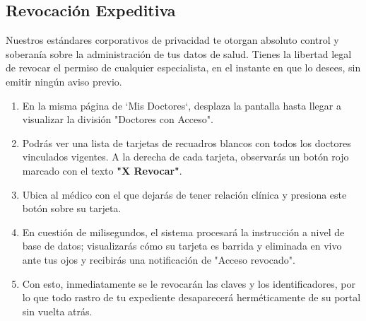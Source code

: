 \subsection{Revocación Expeditiva}
Nuestros estándares corporativos de privacidad te otorgan absoluto control y soberanía sobre la administración de tus datos de salud. Tienes la libertad legal de revocar el permiso de cualquier especialista, en el instante en que lo desees, sin emitir ningún aviso previo.
\begin{enumerate}
    \item En la misma página de `Mis Doctores`, desplaza la pantalla hasta llegar a visualizar la división "Doctores con Acceso".
    \item Podrás ver una lista de tarjetas de recuadros blancos con todos los doctores vinculados vigentes. A la derecha de cada tarjeta, observarás un botón rojo marcado con el texto \textbf{"X Revocar"}.
    \item Ubica al médico con el que dejarás de tener relación clínica y presiona este botón sobre su tarjeta.
    \item En cuestión de milisegundos, el sistema procesará la instrucción a nivel de base de datos; visualizarás cómo su tarjeta es barrida y eliminada en vivo ante tus ojos y recibirás una notificación de "Acceso revocado".
    \item Con esto, inmediatamente se le revocarán las claves y los identificadores, por lo que todo rastro de tu expediente desaparecerá herméticamente de su portal sin vuelta atrás.
\end{enumerate}
